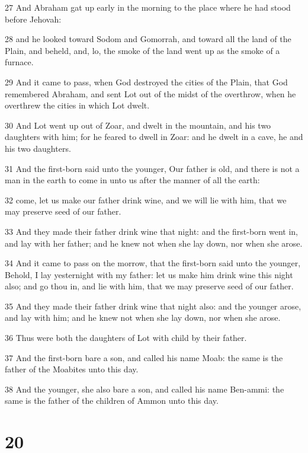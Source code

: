 \par 27 And Abraham gat up early in the morning to the place where he had stood before Jehovah:
\par 28 and he looked toward Sodom and Gomorrah, and toward all the land of the Plain, and beheld, and, lo, the smoke of the land went up as the smoke of a furnace.
\par 29 And it came to pass, when God destroyed the cities of the Plain, that God remembered Abraham, and sent Lot out of the midst of the overthrow, when he overthrew the cities in which Lot dwelt.
\par 30 And Lot went up out of Zoar, and dwelt in the mountain, and his two daughters with him; for he feared to dwell in Zoar: and he dwelt in a cave, he and his two daughters.
\par 31 And the first-born said unto the younger, Our father is old, and there is not a man in the earth to come in unto us after the manner of all the earth:
\par 32 come, let us make our father drink wine, and we will lie with him, that we may preserve seed of our father.
\par 33 And they made their father drink wine that night: and the first-born went in, and lay with her father; and he knew not when she lay down, nor when she arose.
\par 34 And it came to pass on the morrow, that the first-born said unto the younger, Behold, I lay yesternight with my father: let us make him drink wine this night also; and go thou in, and lie with him, that we may preserve seed of our father.
\par 35 And they made their father drink wine that night also: and the younger arose, and lay with him; and he knew not when she lay down, nor when she arose.
\par 36 Thus were both the daughters of Lot with child by their father.
\par 37 And the first-born bare a son, and called his name Moab: the same is the father of the Moabites unto this day.
\par 38 And the younger, she also bare a son, and called his name Ben-ammi: the same is the father of the children of Ammon unto this day.

\chapter{20}

